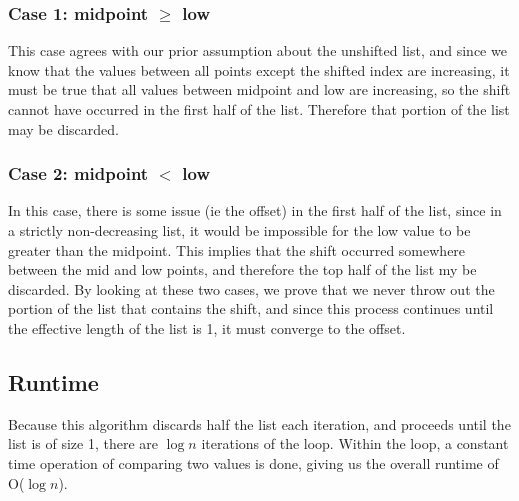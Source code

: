 \documentclass[titlepage]{article}
\numberwithin{equation}{subsection}
\begin{document}
\subsubsection{Case 1: midpoint $\geq$ low}
This case agrees with our prior assumption about the unshifted list, and since we know that the values between
all points except the shifted index are increasing, it must be true that all values between midpoint and low
are increasing, so the shift cannot have occurred in the first half of the list. Therefore that portion of the
list may be discarded.
\subsubsection{Case 2: midpoint $<$ low}
In this case, there is some issue (ie the offset) in the first half of the list, since in a strictly non-decreasing
list, it would be impossible for the low value to be greater than the midpoint. This implies that the shift
occurred somewhere between the mid and low points, and therefore the top half of the list my be discarded.
By looking at these two cases, we prove that we never throw out the portion of the list that contains
the shift, and since this process continues until the effective length of the list is 1, it must converge
to the offset.
\subsection{Runtime}
Because this algorithm discards half the list each iteration, and proceeds until the list is of size 1, there
are $\log n$ iterations of the loop. Within the loop, a constant time operation of comparing two values is done,
giving us the overall runtime of O($\log n$).
\end{document}
